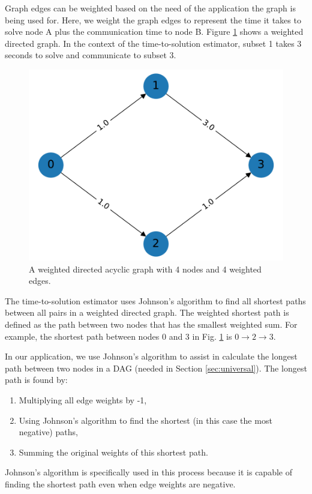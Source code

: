 Graph edges can be weighted based on the need of the application the graph is being used for. Here, we weight the graph edges to represent the time it takes to solve node A plus the communication time to node B. 
Figure \ref{weighted_directed_graph} shows a weighted directed graph. 
In the context of the time-to-solution estimator, subset 1 takes 3 seconds to solve and communicate to subset 3. 
\begin{figure}[H]
\centering
\includegraphics[scale=0.5]{../../figures/weighted_directed_graph.pdf}
\caption{A weighted directed acyclic graph with 4 nodes and 4 weighted edges.}
\label{weighted_directed_graph}
\end{figure}

The time-to-solution estimator uses Johnson's algorithm \cite{intro_to_alg,johnson_nist,johnson_johnson} to find all shortest paths between all pairs in a weighted directed graph. 
The weighted shortest path is defined as the path between two nodes that has the smallest weighted sum. 
For example, the shortest path between nodes 0 and 3 in Fig. \ref{weighted_directed_graph} is $0\rightarrow 2\rightarrow 3$. 

In our application, we use Johnson's algorithm to assist in calculate the longest path between two nodes in a DAG (needed in Section \ref{sec:universal}). 
The longest path is found by:
\begin{enumerate}
  \item Multiplying all edge weights by -1,
  \item Using Johnson's algorithm to find the shortest (in this case the most negative) paths,
  \item Summing the original weights of this shortest path. 
\end{enumerate}
Johnson's algorithm is specifically used in this process because it is capable of finding the shortest path even when edge weights are negative. 

